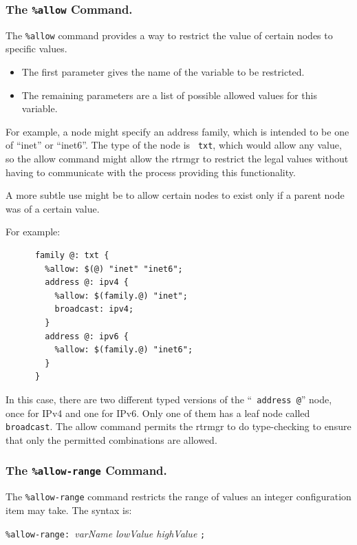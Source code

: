 \documentclass[11pt]{article}
\begin{document}
\subsubsection{The {\tt \%allow} Command.}
The {\tt \%allow} command provides a way to restrict the value of
certain nodes to specific values.

\begin{itemize}

  \item The first parameter gives the name of the variable to be restricted.

  \item The remaining parameters are a list of possible allowed values for
this variable.

\end{itemize}

For example, a node might specify an address family, which is intended
to be one of ``inet'' or ``inet6''.  The type of the node is {\tt
txt}, which would allow any value, so the allow command might allow
the rtrmgr to restrict the legal values without having to
communicate with the process providing this functionality.

A more subtle use might be to allow certain nodes to exist only if a
parent node was of a certain value.

For example:

\begin{verbatim}
      family @: txt {
        %allow: $(@) "inet" "inet6";
        address @: ipv4 {
          %allow: $(family.@) "inet";
          broadcast: ipv4;
        }
        address @: ipv6 {
          %allow: $(family.@) "inet6";
        }
      }
\end{verbatim}

In this case, there are two different typed versions of the ``{\tt
address @}'' node, once for IPv4 and one for IPv6.  Only one of them has
a leaf node called {\tt broadcast}.  The allow command permits the
rtrmgr to do type-checking to ensure that only the permitted
combinations are allowed.

\subsubsection{The {\tt \%allow-range} Command.}

The {\tt \%allow-range} command restricts the range of values an
integer configuration item may take.  The syntax is:

\texttt{\%allow-range: }{\it varName lowValue highValue} \texttt{;}
\end{document}
